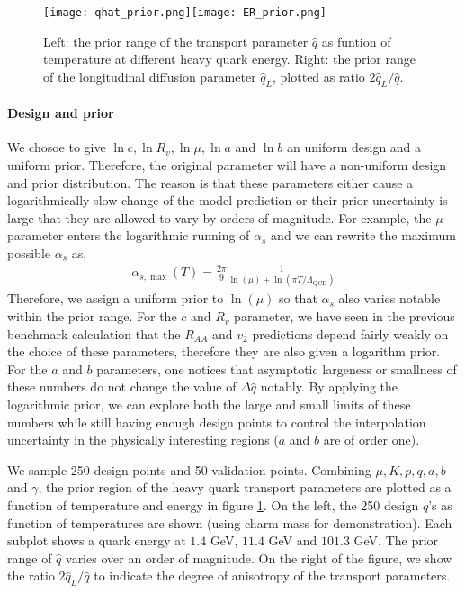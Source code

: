 \begin{figure}
\singlespacing
\centering
\texttt{[image: qhat\_prior.png]}\texttt{[image: ER\_prior.png]}
\caption[Left: the prior range of the transport parameter $\hat{q}$ as funtion]{Left: the prior range of the transport parameter $\hat{q}$ as funtion of temperature at different heavy quark energy. Right: the prior range of the longitudinal diffusion parameter $\hat{q}_L$, plotted as ratio $2\hat{q}_L/\hat{q}$.}
\label{fig:new:design-qhat}
\end{figure}

\paragraph{Design and prior} 
We chosoe to give $\ln c, \ln R_v, \ln \mu, \ln a$ and $\ln b$ an uniform design and a uniform prior.
Therefore, the original parameter will have a non-uniform design and prior distribution.
The reason is that these parameters either cause a logarithmically slow change of the model prediction or their prior uncertainty is large that they are allowed to vary by orders of magnitude.
For example, the $\mu$ parameter enters the logarithmic running of $\alpha_s$ and we can rewrite the maximum possible $\alpha_s$ as,
\begin{eqnarray}
\alpha_{s,\max}(T) = \frac{2\pi}{9}\frac{1}{\ln(\mu) + \ln(\pi T/\Lambda_{\textrm{QCD}})}
\end{eqnarray}
Therefore, we assign a uniform prior to $\ln(\mu)$ so that $\alpha_s$ also varies notable within the prior range.
For the $c$ and $R_v$ parameter, we have seen in the previous benchmark calculation that the $R_{AA}$ and $v_2$ predictions depend fairly weakly on the choice of these parameters, therefore they are also given a logarithm prior.
For the $a$ and $b$ parameters, one notices that asymptotic largeness or smallness of these numbers do not change the value of $\Delta \hat{q}$ notably.
By applying the logarithmic prior, we can explore both the large and small limits of these numbers while still having enough design points to control the interpolation uncertainty in the physically interesting regions ($a$ and $b$ are of order one). 

We sample 250 design points and 50 validation points. 
Combining $\mu, K, p, q, a, b$ and $\gamma$, the prior region of the heavy quark transport parameters are plotted as a function of temperature and energy in figure \ref{fig:new:design-qhat}. 
On the left, the 250 design $\hat{q}$'s as function of temperatures are shown  (using charm mass for demonstration).
Each subplot shows a quark energy at $1.4$ GeV, $11.4$ GeV and $101.3$ GeV.
The prior range of $\hat{q}$ varies over an order of magnitude.
On the right of the figure, we show the ratio $2\hat{q}_L/\hat{q}$ to indicate the degree of anisotropy of the transport parameters.

